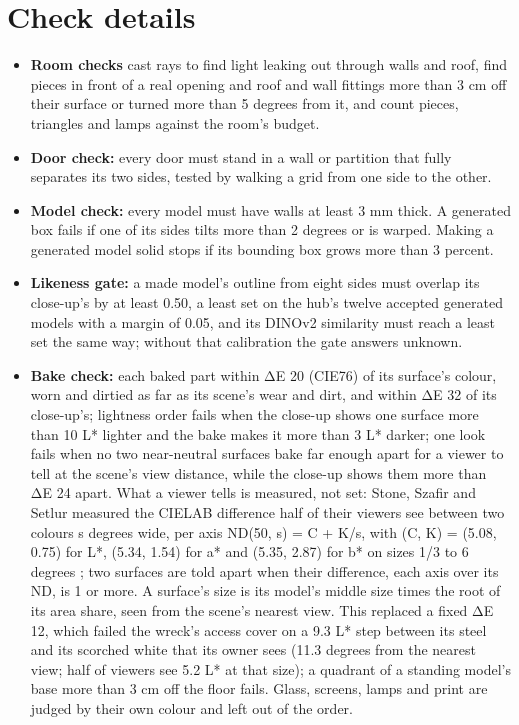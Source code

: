 \section{Check details}\label{check-details}

\begin{itemize}
\tightlist
\item
  \textbf{Room checks} cast rays to find light leaking out through walls and roof, find pieces in front of a real opening and roof and wall fittings more than 3 cm off their surface or turned more than 5 degrees from it, and count pieces, triangles and lamps against the room's budget.
\item
  \textbf{Door check:} every door must stand in a wall or partition that fully separates its two sides, tested by walking a grid from one side to the other.
\item
  \textbf{Model check:} every model must have walls at least 3 mm thick. A generated box fails if one of its sides tilts more than 2 degrees or is warped. Making a generated model solid stops if its bounding box grows more than 3 percent.
\item
  \textbf{Likeness gate:} a made model's outline from eight sides must overlap its close-up's by at least 0.50, a least set on the hub's twelve accepted generated models with a margin of 0.05, and its DINOv2 \citep{oquab2023dinov2} similarity must reach a least set the same way; without that calibration the gate answers unknown.
\item
  \textbf{Bake check:} each baked part within ΔE 20 (CIE76) of its surface's colour, worn and dirtied as far as its scene's wear and dirt, and within ΔE 32 of its close-up's; lightness order fails when the close-up shows one surface more than 10 L* lighter and the bake makes it more than 3 L* darker; one look fails when no two near-neutral surfaces bake far enough apart for a viewer to tell at the scene's view distance, while the close-up shows them more than ΔE 24 apart. What a viewer tells is measured, not set: Stone, Szafir and Setlur measured the CIELAB difference half of their viewers see between two colours s degrees wide, per axis ND(50, s) = C + K/s, with (C, K) = (5.08, 0.75) for L*, (5.34, 1.54) for a* and (5.35, 2.87) for b* on sizes 1/3 to 6 degrees \citep{stone2014size}; two surfaces are told apart when their difference, each axis over its ND, is 1 or more. A surface's size is its model's middle size times the root of its area share, seen from the scene's nearest view. This replaced a fixed ΔE 12, which failed the wreck's access cover on a 9.3 L* step between its steel and its scorched white that its owner sees (11.3 degrees from the nearest view; half of viewers see 5.2 L* at that size); a quadrant of a standing model's base more than 3 cm off the floor fails. Glass, screens, lamps and print are judged by their own colour and left out of the order.

\end{itemize}
